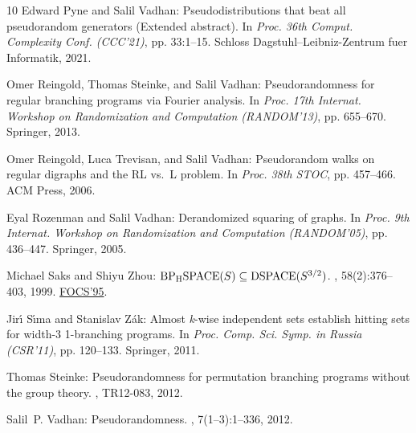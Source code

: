 \begin{thebibliography}{10}
{\sc Edward Pyne and Salil Vadhan}: Pseudodistributions that beat all
  pseudorandom generators ({E}xtended abstract).
\newblock In {\em Proc. 36th Comput. Complexity Conf. (CCC'21)}, pp. 33:1--15.
  Schloss Dagstuhl--Leibniz-Zentrum fuer Informatik, 2021.

{\sc Omer Reingold, Thomas Steinke, and Salil Vadhan}: Pseudorandomness for
  regular branching programs via {F}ourier analysis.
\newblock In {\em Proc. 17th Internat. Workshop on Randomization and
  Computation (RANDOM'13)}, pp. 655--670. Springer, 2013.
\newblock [\epfmtdoi{10.1007/978-3-642-40328-6\_45}]

{\sc Omer Reingold, Luca Trevisan, and Salil Vadhan}: Pseudorandom walks on
  regular digraphs and the \mbox{RL} vs.\ \mbox{L} problem.
\newblock In {\em Proc. 38th STOC}, pp. 457--466. ACM Press, 2006.

{\sc Eyal Rozenman and Salil Vadhan}: Derandomized squaring of graphs.
\newblock In {\em Proc. 9th Internat. Workshop on Randomization and Computation
  (RANDOM'05)}, pp. 436--447. Springer, 2005.
\newblock [\epfmtdoi{10.1007/11538462\_37}]

{\sc Michael Saks and Shiyu Zhou}: {${\rm BP}\sb {\rm H}{\rm
  SPACE}(S)\subseteq{\rm DSPACE}(S\sp {3/2})$}.
, 58(2):376--403, 1999.
\newblock \prelim \href{https://doi.org/10.1109/SFCS.1995.492490}{FOCS'95}.

{\sc Jir\'{\i} S\'{\i}ma and Stanislav Z{\'a}k}: Almost {\it k}-wise
  independent sets establish hitting sets for width-3 1-branching programs.
\newblock In {\em Proc. Comp. Sci. Symp. in Russia (CSR'11)}, pp. 120--133.
  Springer, 2011.
\newblock [\epfmtdoi{10.1007/978-3-642-20712-9\_10}]

{\sc Thomas Steinke}: Pseudorandomness for permutation branching programs
  without the group theory.
, TR12-083, 2012.

{\sc Salil~P. Vadhan}: Pseudorandomness.
, 7(1--3):1--336, 2012.
\newblock [\epfmtdoi{10.1561/0400000010}]


\end{thebibliography}
